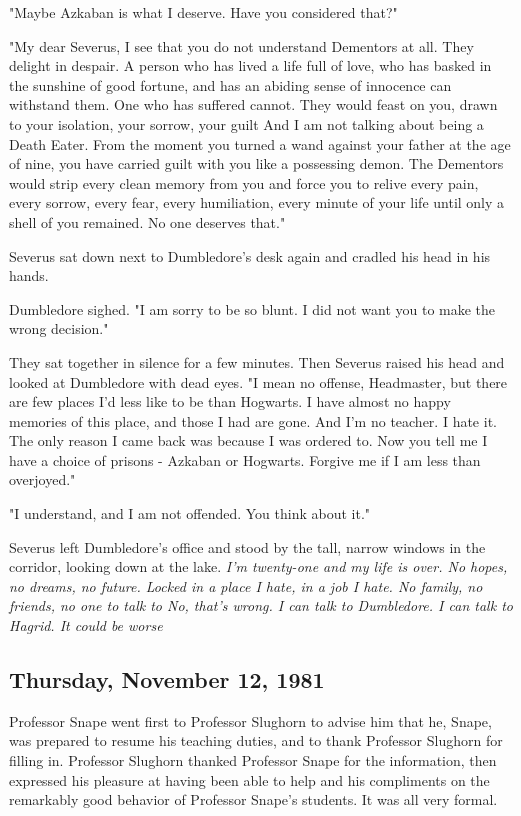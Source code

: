 "Maybe Azkaban is what I deserve. Have you considered that?"

"My dear Severus, I see that you do not understand Dementors at all. They delight in despair. A person who has lived a life full of love, who has basked in the sunshine of good fortune, and has an abiding sense of innocence can withstand them. One who has suffered cannot. They would feast on you, drawn to your isolation, your sorrow, your guilt{\el} And I am not talking about being a Death Eater. From the moment you turned a wand against your father at the age of nine, you have carried guilt with you like a possessing demon. The Dementors would strip every clean memory from you and force you to relive every pain, every sorrow, every fear, every humiliation, every minute of your life until only a shell of you remained. No one deserves that."

Severus sat down next to Dumbledore's desk again and cradled his head in his hands.

Dumbledore sighed. "I am sorry to be so blunt. I did not want you to make the wrong decision."

They sat together in silence for a few minutes. Then Severus raised his head and looked at Dumbledore with dead eyes. "I mean no offense, Headmaster, but there are few places I'd less like to be than Hogwarts. I have almost no happy memories of this place, and those I had are{\el} gone. And I'm no teacher. I hate it. The only reason I came back was because I was ordered to. Now you tell me I have a choice of prisons - Azkaban or Hogwarts. Forgive me if I am less than overjoyed."

"I understand, and I am not offended. You think about it."

Severus left Dumbledore's office and stood by the tall, narrow windows in the corridor, looking down at the lake. \emph{I'm twenty-one and my life is over. No hopes, no dreams, no future. Locked in a place I hate, in a job I hate. No family, no friends, no one to talk to{\el} No, that's wrong. I can talk to Dumbledore. I can talk to Hagrid. It could be worse{\el}}

\subsection{Thursday, November 12, 1981}

Professor Snape went first to Professor Slughorn to advise him that he, Snape, was prepared to resume his teaching duties, and to thank Professor Slughorn for filling in. Professor Slughorn thanked Professor Snape for the information, then expressed his pleasure at having been able to help and his compliments on the remarkably good behavior of Professor Snape's students. It was all very formal.

